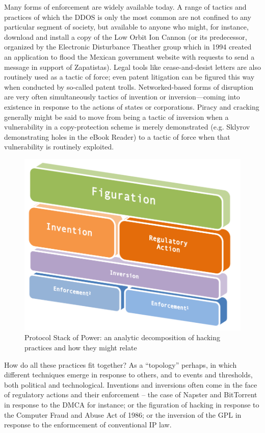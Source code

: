 \documentclass[10pt,letter,oneside]{scrartcl}
\begin{document}
Many forms of enforcement are widely available today.  A range of tactics and
practices of which the DDOS is only the most common are not confined to any
particular segment of society, but available to anyone who might, for instance,
download and install a copy of the Low Orbit Ion Cannon (or its predecessor,
organized by the Electronic Disturbance Theather group which in 1994 created
an application to flood the Mexican government website with requests to send
a message in support of Zapatistas).  Legal tools like cease-and-desist letters 
are also routinely used as a tactic of force; even patent litigation can be 
figured this way when conducted by so-called patent trolls.  Networked-based 
forms of disruption are very often simultaneously tactics of invention or 
inversion—coming into existence in response to the actions of states or 
corporations.  Piracy and cracking generally might be said to move from 
being a tactic of inversion when a vulnerability in a copy-protection 
scheme is merely demonstrated (e.g. Sklyrov demonstrating holes in the 
eBook Reader) to a tactic of force when that vulnerability is routinely
exploited.


\begin{figure} \centering \includegraphics{images/protocolstackV2}
\caption{Protocol Stack of Power: an analytic decomposition of hacking practices
and how they might relate} \label{fig:ProtocolStack} \end{figure}


How do all these practices fit together?  As a ``topology'' perhaps, in which
different techniques emerge in response to others, and to events and thresholds,
both political and technological.  Inventions and inversions often come in the
face of regulatory actions and their enforcement -- the case of Napster and
BitTorrent in response to the DMCA for instance; or the figuration of hacking in
response to the Computer Fraud and Abuse Act of 1986; or the inversion of the 
GPL in response to the enformcement of conventional IP law.
\end{document}
